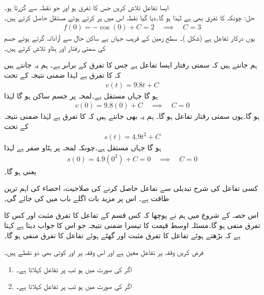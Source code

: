 ایسا تفاعل  تلاش کریں جس کا تفرق  ہو اور جو نقطہ  سے گزرتا ہو۔\\
حل:\quad
چونکہ  کا تفرق بھی  ہے لہٰذا  ہو گا۔دیا گیا نقطہ اس میں پر کرتے ہوئے مستقل حاصل کرتے ہیں۔
\begin{align*}
f(0)=-\cos(0)+C=2\quad \implies\quad C=3
\end{align*} 
یوں درکار تفاعل  ہے (شکل )۔
سطح زمین کے قریب جہاں  ہے ساکن حال سے آزادانہ گرتے ہوئے جسم کی سمتی رفتار اور ہٹاو تلاش کرتے ہیں۔

ہم جانتے ہیں کہ سمتی رفتار  ایسا تفاعل ہے جس کا تفرق  کے برابر ہے۔ ہم یہ جانتے ہیں کہ  کا تفرق  ہے لہٰذا ضمنی نتیجہ  کے تحت
\begin{align*}
v(t)=9.8t+C
\end{align*}
ہو گا جہاں  مستقل ہے۔لمحہ  پر جسم ساکن ہو گا لہٰذا
\begin{align*}
v(0)=9.8(0)+C\quad \implies \quad C=0 
\end{align*}
ہو گا۔یوں سمتی رفتار تفاعل  ہو گا۔ ہم یہ بھی جانتے ہیں کہ  کا تفرق  ہے لہٰذا  ضمنی نتیجہ  کے تحت
\begin{align*}
s(t)=4.9t^2+C
\end{align*}
ہو گا جہاں  مستقل ہے۔چونکہ لمحہ  پر ہٹاو صفر ہے لہٰذا
\begin{align*}
s(0)=4.9(0^2)+C=0\quad \implies \quad C=0
\end{align*} 
یعنی  ہو گا۔

کسی تفاعل کی شرح تبدیلی سے تفاعل حاصل کرنے کی صلاحیت، احصاء کی اہم ترین طاقت ہے۔ اس پر مزید بات اگلے باب میں کی جائے گی۔

اس حصہ کے شروع میں ہم نے پوچھا کہ کس قسم کے تفاعل کا تفرق مثبت اور کس کا تفرق منفی ہو گا۔مسئلہ اوسط قیمت کا تیسرا ضمنی نتیجہ جو اس کا جواب دیتا ہے کہتا ہے کہ بڑھتے ہوئے تفاعل کا تفرق مثبت اور گھٹے ہوئے تفاعل کا تفرق منفی ہو گا۔

فرض کریں وقفہ  پر تفاعل  معین ہے اور اس وقفہ پر  اور  کوئی بھی دو نقطے ہیں۔
\begin{enumerate}[1.]
\item
اگر  کی صورت میں  ہو تب  پر   تفاعل کہلاتا ہے۔
\item
اگر  کی صورت میں  ہو تب  پر   تفاعل کہلاتا  ہے۔
\end{enumerate}

